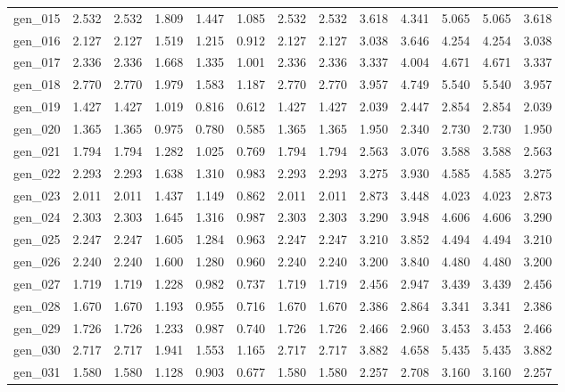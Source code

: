 \begin{tabular}{lrrrrrrrrrrrr}
gen\_015 &  2.532 &  2.532 &  1.809 &  1.447 &  1.085 &  2.532 &  2.532 &  3.618 &  4.341 &  5.065 &  5.065 &  3.618 \\
gen\_016 &  2.127 &  2.127 &  1.519 &  1.215 &  0.912 &  2.127 &  2.127 &  3.038 &  3.646 &  4.254 &  4.254 &  3.038 \\
gen\_017 &  2.336 &  2.336 &  1.668 &  1.335 &  1.001 &  2.336 &  2.336 &  3.337 &  4.004 &  4.671 &  4.671 &  3.337 \\
gen\_018 &  2.770 &  2.770 &  1.979 &  1.583 &  1.187 &  2.770 &  2.770 &  3.957 &  4.749 &  5.540 &  5.540 &  3.957 \\
gen\_019 &  1.427 &  1.427 &  1.019 &  0.816 &  0.612 &  1.427 &  1.427 &  2.039 &  2.447 &  2.854 &  2.854 &  2.039 \\
gen\_020 &  1.365 &  1.365 &  0.975 &  0.780 &  0.585 &  1.365 &  1.365 &  1.950 &  2.340 &  2.730 &  2.730 &  1.950 \\
gen\_021 &  1.794 &  1.794 &  1.282 &  1.025 &  0.769 &  1.794 &  1.794 &  2.563 &  3.076 &  3.588 &  3.588 &  2.563 \\
gen\_022 &  2.293 &  2.293 &  1.638 &  1.310 &  0.983 &  2.293 &  2.293 &  3.275 &  3.930 &  4.585 &  4.585 &  3.275 \\
gen\_023 &  2.011 &  2.011 &  1.437 &  1.149 &  0.862 &  2.011 &  2.011 &  2.873 &  3.448 &  4.023 &  4.023 &  2.873 \\
gen\_024 &  2.303 &  2.303 &  1.645 &  1.316 &  0.987 &  2.303 &  2.303 &  3.290 &  3.948 &  4.606 &  4.606 &  3.290 \\
gen\_025 &  2.247 &  2.247 &  1.605 &  1.284 &  0.963 &  2.247 &  2.247 &  3.210 &  3.852 &  4.494 &  4.494 &  3.210 \\
gen\_026 &  2.240 &  2.240 &  1.600 &  1.280 &  0.960 &  2.240 &  2.240 &  3.200 &  3.840 &  4.480 &  4.480 &  3.200 \\
gen\_027 &  1.719 &  1.719 &  1.228 &  0.982 &  0.737 &  1.719 &  1.719 &  2.456 &  2.947 &  3.439 &  3.439 &  2.456 \\
gen\_028 &  1.670 &  1.670 &  1.193 &  0.955 &  0.716 &  1.670 &  1.670 &  2.386 &  2.864 &  3.341 &  3.341 &  2.386 \\
gen\_029 &  1.726 &  1.726 &  1.233 &  0.987 &  0.740 &  1.726 &  1.726 &  2.466 &  2.960 &  3.453 &  3.453 &  2.466 \\
gen\_030 &  2.717 &  2.717 &  1.941 &  1.553 &  1.165 &  2.717 &  2.717 &  3.882 &  4.658 &  5.435 &  5.435 &  3.882 \\
gen\_031 &  1.580 &  1.580 &  1.128 &  0.903 &  0.677 &  1.580 &  1.580 &  2.257 &  2.708 &  3.160 &  3.160 &  2.257 \\

\end{tabular}
